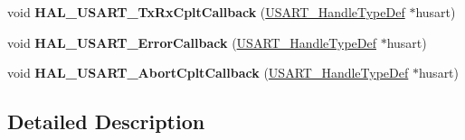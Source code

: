 \begin{DoxyCompactItemize}
\item 
\mbox{\label{group___u_s_a_r_t___exported___functions___group2_ga5ed0ad2c026a5d53cda4485557558eaa}} 
void {\bfseries H\+A\+L\+\_\+\+U\+S\+A\+R\+T\+\_\+\+Tx\+Rx\+Cplt\+Callback} (\hyperlink{struct_u_s_a_r_t___handle_type_def}{U\+S\+A\+R\+T\+\_\+\+Handle\+Type\+Def} $\ast$husart)
\item 
\mbox{\label{group___u_s_a_r_t___exported___functions___group2_gae7e2b482040e13cb538fa507617f8229}} 
void {\bfseries H\+A\+L\+\_\+\+U\+S\+A\+R\+T\+\_\+\+Error\+Callback} (\hyperlink{struct_u_s_a_r_t___handle_type_def}{U\+S\+A\+R\+T\+\_\+\+Handle\+Type\+Def} $\ast$husart)
\item 
\mbox{\label{group___u_s_a_r_t___exported___functions___group2_ga73799961281fd53c34c659b9d0baf84b}} 
void {\bfseries H\+A\+L\+\_\+\+U\+S\+A\+R\+T\+\_\+\+Abort\+Cplt\+Callback} (\hyperlink{struct_u_s_a_r_t___handle_type_def}{U\+S\+A\+R\+T\+\_\+\+Handle\+Type\+Def} $\ast$husart)
\end{DoxyCompactItemize}


\subsection{Detailed Description}
